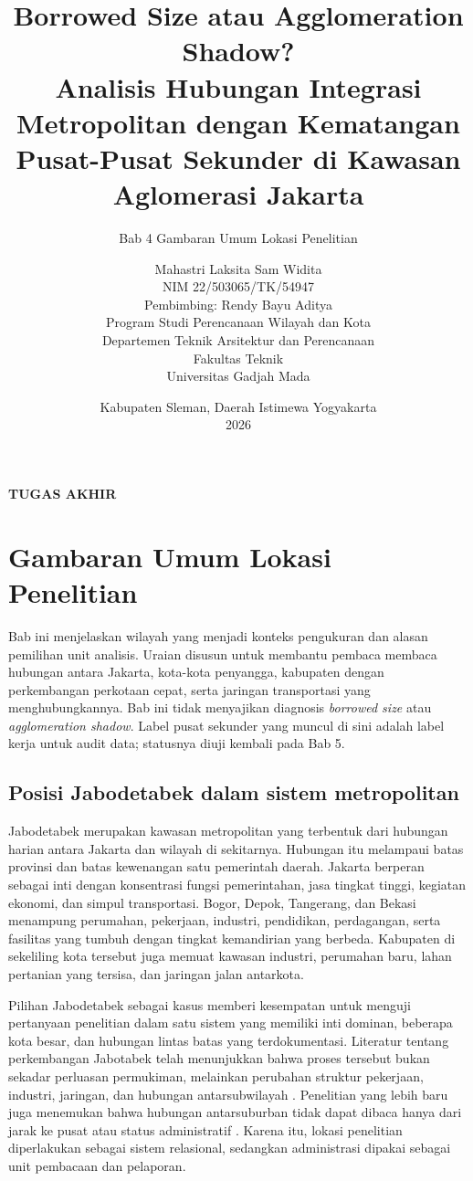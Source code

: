 \documentclass[11pt,a4paper,oneside,openany,indonesian]{report}
\title{\textbf{Borrowed Size atau Agglomeration Shadow?}\\[0.4em]
Analisis Hubungan Integrasi Metropolitan dengan Kematangan Pusat-Pusat Sekunder di Kawasan Aglomerasi Jakarta}
\subtitle{Bab 4 Gambaran Umum Lokasi Penelitian}
\author{Mahastri Laksita Sam Widita\\NIM 22/503065/TK/54947\\[0.5em]
Pembimbing: Rendy Bayu Aditya\\[0.5em]
Program Studi Perencanaan Wilayah dan Kota\\
Departemen Teknik Arsitektur dan Perencanaan\\
Fakultas Teknik\\
Universitas Gadjah Mada}
\date{Kabupaten Sleman, Daerah Istimewa Yogyakarta\\2026}
\makeatletter
\renewcommand{\maketitle}{%
  \begin{titlepage}
    \centering
    {\Large\bfseries TUGAS AKHIR\par}
    \vfill
    {\LARGE\bfseries \@title\par}
    \vspace{1.2cm}
    {\large \thesubtitle\par}
    \vfill
    {\large \@author\par}
    \vfill
    {\large \@date\par}
  \end{titlepage}}
\makeatother
\begin{document}
\maketitle
\tableofcontents
\clearpage
\setcounter{chapter}{3}
\chapter{Gambaran Umum Lokasi Penelitian}

Bab ini menjelaskan wilayah yang menjadi konteks pengukuran dan alasan pemilihan unit analisis. Uraian disusun untuk membantu pembaca membaca hubungan antara Jakarta, kota-kota penyangga, kabupaten dengan perkembangan perkotaan cepat, serta jaringan transportasi yang menghubungkannya. Bab ini tidak menyajikan diagnosis \emph{borrowed size} atau \emph{agglomeration shadow}. Label pusat sekunder yang muncul di sini adalah label kerja untuk audit data; statusnya diuji kembali pada Bab 5.

\section{Posisi Jabodetabek dalam sistem metropolitan}

Jabodetabek merupakan kawasan metropolitan yang terbentuk dari hubungan harian antara Jakarta dan wilayah di sekitarnya. Hubungan itu melampaui batas provinsi dan batas kewenangan satu pemerintah daerah. Jakarta berperan sebagai inti dengan konsentrasi fungsi pemerintahan, jasa tingkat tinggi, kegiatan ekonomi, dan simpul transportasi. Bogor, Depok, Tangerang, dan Bekasi menampung perumahan, pekerjaan, industri, pendidikan, perdagangan, serta fasilitas yang tumbuh dengan tingkat kemandirian yang berbeda. Kabupaten di sekeliling kota tersebut juga memuat kawasan industri, perumahan baru, lahan pertanian yang tersisa, dan jaringan jalan antarkota.

Pilihan Jabodetabek sebagai kasus memberi kesempatan untuk menguji pertanyaan penelitian dalam satu sistem yang memiliki inti dominan, beberapa kota besar, dan hubungan lintas batas yang terdokumentasi. Literatur tentang perkembangan Jabotabek telah menunjukkan bahwa proses tersebut bukan sekadar perluasan permukiman, melainkan perubahan struktur pekerjaan, industri, jaringan, dan hubungan antarsubwilayah \parencite{henderson1996,hudalahfirman2012,hudalahetal2013}. Penelitian yang lebih baru juga menemukan bahwa hubungan antarsuburban tidak dapat dibaca hanya dari jarak ke pusat atau status administratif \parencite{sadewoetal2023,aritenang2023}. Karena itu, lokasi penelitian diperlakukan sebagai sistem relasional, sedangkan administrasi dipakai sebagai unit pembacaan dan pelaporan.
\end{document}
